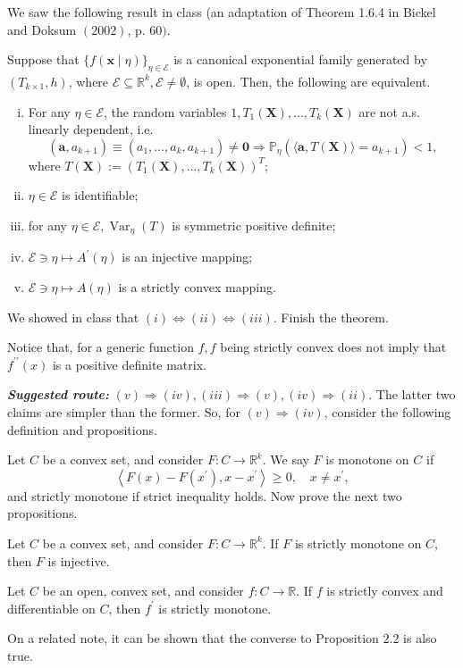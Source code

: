 \begin{ex}
    We saw the following result in class (an adaptation of Theorem 1.6.4 in Bickel and Doksum \((2002)\), p. 60\()\).
    
     Suppose that \(\{f(\boldsymbol{x} \mid \eta)\}_{\eta \in \mathcal{E}}\) is a canonical exponential family generated by \(\left(T_{k \times 1}, h\right)\), where \(\mathcal{E} \subseteq \mathbb{R}^{k}, \mathcal{E} \neq \emptyset\), is open. Then, the following are equivalent.
    \begin{enumerate}[(i)]
        \item For any \(\eta \in \mathcal{E}\), the random variables \(1, T_{1}(\boldsymbol{X}), \ldots, T_{k}(\boldsymbol{X})\) are not a.s. linearly dependent, i.e.
        \[
            \left(\mathbf{a}, a_{k+1}\right) \equiv\left(a_{1}, \ldots, a_{k}, a_{k+1}\right) \neq \mathbf{0} \Rightarrow \mathbb{P}_{\eta}\left(\langle\mathbf{a}, T(\boldsymbol{X})\rangle=a_{k+1}\right)<1, 
        \]
        where \(T(\boldsymbol{X}):=\left(T_{1}(\boldsymbol{X}), \ldots, T_{k}(\boldsymbol{X})\right)^T\); 
        \item \(\eta \in \mathcal{E}\) is identifiable;
        \item for any \(\eta \in \mathcal{E}, \operatorname{Var}_{\eta}(T)\) is symmetric positive definite;
        \item \(\mathcal{E} \ni \eta \mapsto A^{\prime}(\eta)\) is an injective mapping;
        \item \(\mathcal{E} \ni \eta \mapsto A(\eta)\) is a strictly convex mapping. 
    \end{enumerate}
    We showed in class that \((i) \Leftrightarrow(i i) \Leftrightarrow(i i i)\). Finish the theorem.
    
     Notice that, for a generic function \(f, f\) being strictly convex does not imply that \(f^{\prime \prime}(x)\) is a positive definite matrix.

    \emph{\bfseries Suggested route:} \((v) \Rightarrow(i v),(i i i) \Rightarrow(v),(i v) \Rightarrow(i i)\). The latter two claims are simpler than the former. So, for \((v) \Rightarrow(i v)\), consider the following definition and propositions. 

     Let \(C\) be a convex set, and consider \(F: C \rightarrow \mathbb{R}^{k}\). We say \(F\) is monotone on \(C\) if
    \[
    \left\langle F(x)-F\left(x^{\prime}\right), x-x^{\prime}\right\rangle \geq 0, \quad x \neq x^{\prime},
    \]
    and strictly monotone if strict inequality holds. Now prove the next two propositions. 

     Let \(C\) be a convex set, and consider \(F: C \rightarrow \mathbb{R}^{k}\). If \(F\) is strictly monotone on \(C\), then \(F\) is injective.

     Let \(C\) be an open, convex set, and consider \(f: C \rightarrow \mathbb{R}\). If \(f\) is strictly convex and differentiable on \(C\), then \(f^{\prime}\) is strictly monotone.

    On a related note, it can be shown that the converse to Proposition \(2.2\) is also true.
\end{ex}

